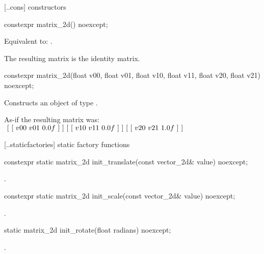  [\iotwod.\matrixtwod.cons] { constructors}

%
\begin{itemdecl}
constexpr matrix_2d() noexcept;
\end{itemdecl}
\begin{itemdescr}
\pnum
\effects
Equivalent to: .

\pnum
\begin{note}
The resulting matrix is the identity matrix.
\end{note}
\end{itemdescr}

%
\begin{itemdecl}
constexpr matrix_2d(float v00, float v01, float v10, float v11,
  float v20, float v21) noexcept;
\end{itemdecl}
\begin{itemdescr}
\pnum
\effects
Constructs an object of type .

\pnum
As-if the resulting matrix was: \\
$
~[~[~v00~v01~0.0f~]~] \\
~[~[~v10~v11~0.0f~]~] \\
~[~[~v20~v21~1.0f~]~]$

\end{itemdescr}

 [\iotwod.\matrixtwod.staticfactories] { static factory 
functions}

%
\begin{itemdecl}
constexpr static matrix_2d init_translate(const vector_2d& value) noexcept;
\end{itemdecl}
\begin{itemdescr}
\pnum
\returns
{}.
\end{itemdescr}

%
\begin{itemdecl}
constexpr static matrix_2d init_scale(const vector_2d& value) noexcept;
\end{itemdecl}
\begin{itemdescr}
\pnum
\returns
{}.
\end{itemdescr}

%
\begin{itemdecl}
static matrix_2d init_rotate(float radians) noexcept;
\end{itemdecl}
\begin{itemdescr}
\pnum
\returns
{}.
\end{itemdescr}

